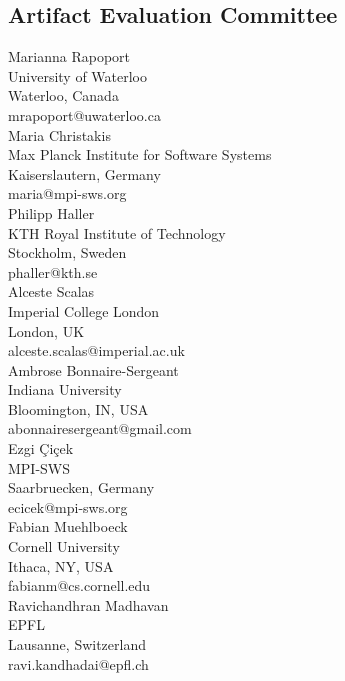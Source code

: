 \documentclass[a4paper,UKenglish]{dartsmaster}
\begin{document}
\begin{participants}

\chapter[Committee]{Artifact Evaluation Committee}
\participant Marianna Rapoport\\
University of Waterloo\\
Waterloo, Canada\\
mrapoport@uwaterloo.ca\\

\participant Maria Christakis \\
Max Planck Institute for Software Systems \\
Kaiserslautern, Germany\\ 
maria@mpi-sws.org\\

\participant Philipp Haller\\
KTH Royal Institute of Technology\\
Stockholm, Sweden\\ 
phaller@kth.se\\

\participant	Alceste Scalas	\\	Imperial College London	\\	London, UK	\\	alceste.scalas@imperial.ac.uk	\\

\participant	Ambrose Bonnaire-Sergeant	\\	Indiana University	\\	Bloomington, IN, USA	\\	abonnairesergeant@gmail.com	\\

\participant	Ezgi Çiçek	\\	MPI-SWS	\\	Saarbruecken, Germany	\\	ecicek@mpi-sws.org	\\

\participant	Fabian Muehlboeck	\\	Cornell University	\\	Ithaca, NY, USA	\\	fabianm@cs.cornell.edu	\\

\participant	Ravichandhran Madhavan	\\	EPFL	\\	Lausanne, Switzerland	\\	ravi.kandhadai@epfl.ch	\\


\end{participants}
\end{document}
